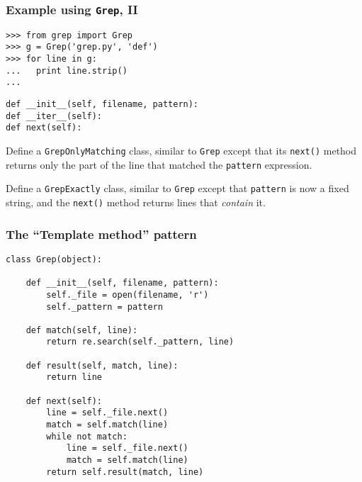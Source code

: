 \documentclass[english,serif,mathserif,xcolor=pdftex,dvipsnames,table]{beamer}
\begin{document}
\begin{frame}[fragile]
  \frametitle{Example using \texttt{Grep}, II}
\begin{lstlisting}
>>> from grep import Grep
>>> g = Grep('grep.py', 'def')
>>> for line in g:
...   print line.strip()
... 
\end{lstlisting}
\vspace{-1.5em}
\begin{verbatim}
def __init__(self, filename, pattern):
def __iter__(self):
def next(self):
\end{verbatim}
\end{frame}


\begin{frame}[fragile]
  \begin{exercise}
    Define a \texttt{GrepOnlyMatching} class, similar to \texttt{Grep}
    except that its \texttt{next()} method returns only the part of
    the line that matched the \texttt{pattern} expression.
  \end{exercise}

  \+
  \begin{exercise}
    Define a \texttt{GrepExactly} class, similar to \texttt{Grep}
    except that \texttt{pattern} is now a fixed string, and the
    \texttt{next()} method returns lines that \emph{contain} it.
  \end{exercise}
\end{frame}


\begin{frame}[fragile]
  \frametitle{The ``Template method'' pattern}
\begin{lstlisting}[basicstyle=\ttfamily\footnotesize]
class Grep(object):

    def __init__(self, filename, pattern):
        self._file = open(filename, 'r')
        self._pattern = pattern

    def match(self, line):
        return re.search(self._pattern, line)

    def result(self, match, line):
        return line

    def next(self):
        line = self._file.next()
        match = self.match(line)
        while not match:
            line = self._file.next()
            match = self.match(line)
        return self.result(match, line)
\end{lstlisting}
\end{frame}
\end{document}
